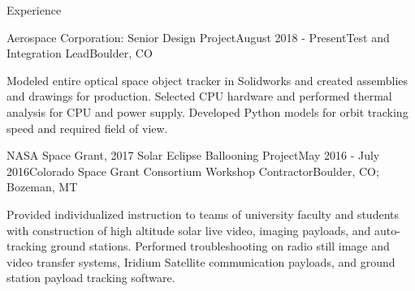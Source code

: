 \documentclass{resume} %
\begin{document}
\begin{rSection}{Experience}

\begin{rSubsection}{Aerospace Corporation: Senior Design Project}{August 2018 - Present}{Test and Integration Lead}{Boulder, CO}
\item {\small Modeled entire optical space object tracker in Solidworks and created assemblies and drawings for production. Selected CPU hardware and performed thermal analysis for CPU and power supply. Developed Python models for orbit tracking speed and required field of view. }
\end{rSubsection}



\begin{rSubsection}{NASA Space Grant, 2017 Solar Eclipse Ballooning Project}{May 2016 - July 2016}{Colorado Space Grant Consortium Workshop Contractor}{Boulder, CO; Bozeman, MT}
\item {\small Provided individualized instruction to teams of university faculty and students with construction of high altitude solar live video, imaging payloads, and auto-tracking ground stations. Performed troubleshooting on radio still image and video transfer systems, Iridium Satellite communication payloads, and ground station payload tracking software.}
\end{rSubsection}










\end{rSection}
\end{document}
